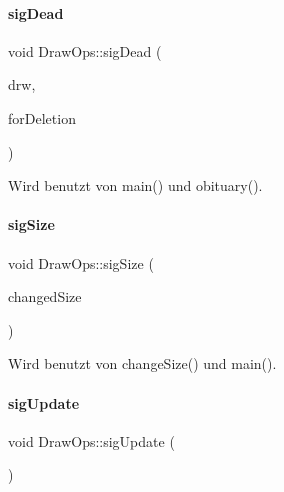 \mbox{\label{classDrawOps_ad121a0a6a2c1f022216b44159c022c0a}} 
\paragraph{\texorpdfstring{sig\+Dead}{sigDead}}
{\footnotesize\ttfamily void Draw\+Ops\+::sig\+Dead (\begin{DoxyParamCaption}\item[{const \mbox{\hyperlink{classDrawing}{Drawing}} $\ast$}]{drw,  }\item[{Q\+Wait\+Condition $\ast$}]{for\+Deletion }\end{DoxyParamCaption})\hspace{0.3cm}{\ttfamily [signal]}}



Wird benutzt von main() und obituary().

\mbox{\label{classDrawOps_a2e49eface451924dbcf4b5687285ab88}} 
\paragraph{\texorpdfstring{sig\+Size}{sigSize}}
{\footnotesize\ttfamily void Draw\+Ops\+::sig\+Size (\begin{DoxyParamCaption}\item[{Q\+Wait\+Condition $\ast$}]{changed\+Size }\end{DoxyParamCaption})\hspace{0.3cm}{\ttfamily [signal]}}



Wird benutzt von change\+Size() und main().

\mbox{\label{classDrawOps_a274f32dcc53300fc594ab5683a0e2071}} 
\paragraph{\texorpdfstring{sig\+Update}{sigUpdate}}
{\footnotesize\ttfamily void Draw\+Ops\+::sig\+Update (\begin{DoxyParamCaption}{ }\end{DoxyParamCaption})\hspace{0.3cm}{\ttfamily [signal]}}



